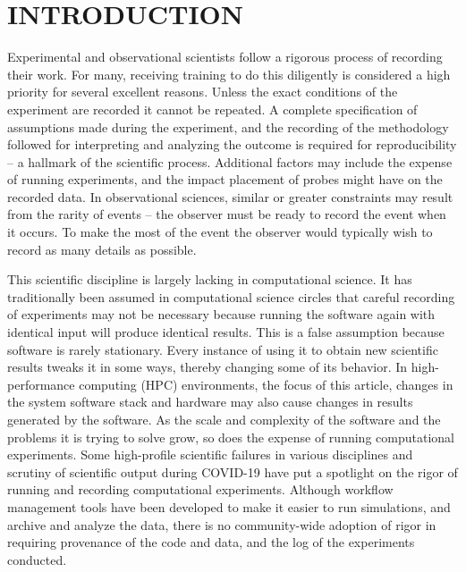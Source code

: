 \documentclass{IEEEcsmag}
\begin{document}
\maketitle

\section{INTRODUCTION}
Experimental and observational scientists follow a rigorous process of recording their work. For many, receiving training to do this diligently is considered a high priority for several excellent reasons. Unless the exact conditions of the experiment are recorded it cannot be repeated. A complete specification of assumptions made during the experiment, and the recording of the methodology followed for
interpreting and analyzing the outcome is required for
reproducibility -- a hallmark of the scientific
process. Additional factors may include the expense of running experiments, and the impact placement of probes might have on the recorded data.  In observational sciences, similar or greater constraints may result from the rarity of events -- the observer
must be ready to record the event when it occurs. To make the most of the event the observer would typically
wish to record as many details as possible.

This scientific discipline is largely lacking in computational science. It has traditionally been
assumed in computational science circles that careful recording of experiments may not be necessary because running the software again with identical input will produce identical results. This is a false assumption because software is rarely stationary. Every instance
of using it to obtain new scientific results tweaks it in some ways, thereby changing some of its behavior. In high-performance computing (HPC) 
 environments, the focus of this article,  changes in the system software stack and hardware may also cause
changes in results generated by the software. As the scale and complexity of the software and the problems it is trying to solve grow, so does the expense of running computational experiments. Some high-profile scientific failures in various disciplines and scrutiny of scientific output during COVID-19 have put a spotlight on the rigor of running and recording computational
experiments. Although workflow management tools have been developed to make it easier to run simulations, and archive and analyze the data, there is no community-wide adoption of rigor in requiring provenance of the code and data, and the log of the experiments conducted. 
\end{document}

